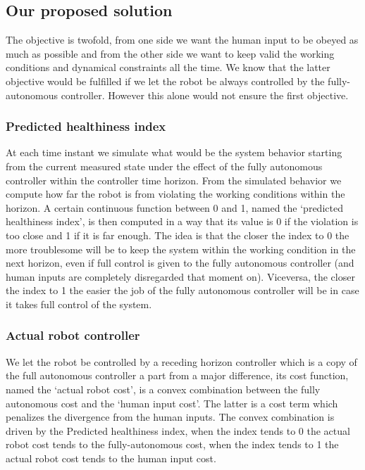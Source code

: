 \subsection{Our proposed solution}

The objective is twofold, from one side we want the human input to be obeyed as much as possible and from the other side we want to keep valid the working conditions and dynamical constraints all the time. We know that the latter objective would be fulfilled if we  let the robot be always controlled by the fully-autonomous controller. However this alone would not ensure the first objective.


\subsubsection{Predicted healthiness index} 

At each time instant we simulate what would be the system behavior starting from the current measured state under the effect of the fully autonomous controller within the controller time horizon. From the simulated behavior we compute how far the robot is from violating the working conditions within the horizon. A certain continuous function between 0 and 1, named the `predicted healthiness index', is then computed in a way that its value is 0 if the violation is too close and 1 if it is far enough. The idea is that the closer the index to 0 the more troublesome will be to keep the system within the working condition in the next horizon, even if full control is given to the fully autonomous controller (and human inputs are completely disregarded that moment on). Viceversa, the closer the index to 1 the easier the job of the fully autonomous controller will be in case it takes full control of the system.

\subsubsection{Actual robot controller} 

We let the robot be controlled by a receding horizon controller which is a copy of the full autonomous controller a part from a major difference, its cost function, named the `actual robot cost', is a convex combination between the fully autonomous cost and the `human input cost'. The latter is a cost term which penalizes the divergence from the human inputs. The convex combination is driven by the  Predicted healthiness index, when the index tends to 0 the actual robot cost tends to the fully-autonomous cost, when the index tends to 1 the actual robot cost tends to the human input cost.




